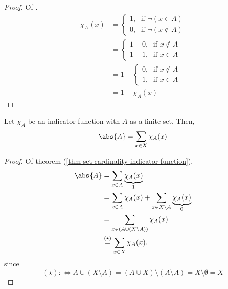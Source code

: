 \begin{proof}
    Of .
    \begin{align*}
        \chi_{\overline{A}}(x) &= \begin{cases}
            1,\;\text{ if } \neg(x \in A) \\
            0,\;\text{ if } \neg(x \notin A)
        \end{cases} \\
        &= \begin{cases}
            1-0,\;\text{ if } x \notin A \\
            1-1,\;\text{ if } x \in A
        \end{cases} \\
        &=1 - \begin{cases}
            0,\;\text{ if } x \notin A \\
            1,\;\text{ if } x \in A
        \end{cases} \\
        &= 1 - \chi_A(x)
    \end{align*}
\end{proof}

\begin{thm}\label{thm-set-cardinality-indicator-function}
    Let $\chi_A$ be an indicator function with $A$ as a finite set. Then,
    \begin{equation*}
        \abs{A} = \sum_{x \in X} \chi_A(x)
    \end{equation*}
\end{thm}

\begin{proof}
    Of theorem (\ref{thm-set-cardinality-indicator-function}).
    \begin{align*}
        \abs{A} &=\sum_{x\in A}\underbrace{\chi_A(x)}_{1}\\
                &=\sum_{x\in A}\chi_A(x)+\sum_{x\in X\setminus A}\underbrace{\chi_A(x)}_{0}\\
                &=\sum_{x\in (A\cup (X\setminus A))}\chi_A(x)\\
                &\overset{(\star)}{=}\sum_{x\in X}\chi_A(x).
    \end{align*}
    since 
    \begin{equation*}
        (\star) :\Leftrightarrow A\cup(X\setminus A)=(A\cup X)\setminus(A\setminus A)=X\setminus \emptyset=X
    \end{equation*}
\end{proof}

